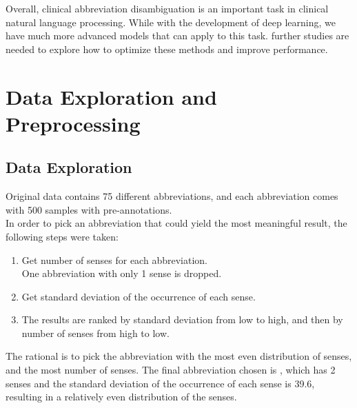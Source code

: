 \documentclass{article}
\begin{document}
    Overall, clinical abbreviation disambiguation is an important task in clinical natural language processing. While with the development of deep learning, we have much more advanced models that can apply to this task. further studies are needed to explore how to optimize these methods and improve performance. 

    \section{Data Exploration and Preprocessing}
    \subsection{Data Exploration}
    Original data contains 75 different abbreviations, and each abbreviation comes with 500 samples with pre-annotations.\\
    In order to pick an abbreviation that could yield the most meaningful result, the following steps were taken:
    \begin{enumerate}
        \item Get number of senses for each abbreviation.\\
              One abbreviation with only 1 sense is dropped.
        \item Get standard deviation of the occurrence of each sense.
        \item The results are ranked by standard deviation from low to high, and then by number of senses from high to low.
    \end{enumerate}
    The rational is to pick the abbreviation with the most even distribution of senses, and the most number of senses.
    The final abbreviation chosen is , which has 2 senses and the standard deviation of the occurrence of each sense is 39.6, resulting in a relatively even distribution of the senses.
\end{document}
